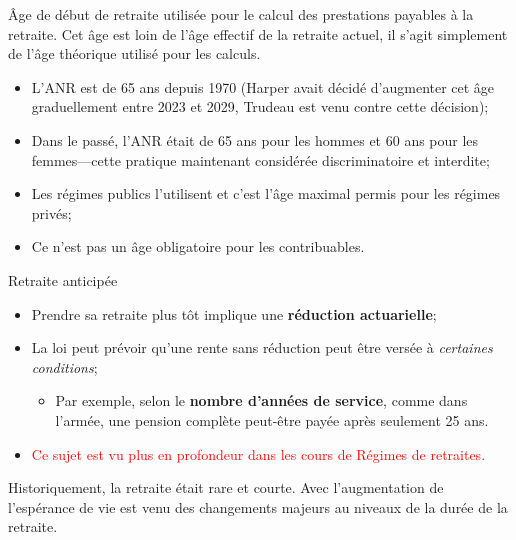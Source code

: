 \documentclass[10pt, french]{article}
\begin{document}
\begin{multicols*}{3}

\begin{definitionNOHFILL}
Âge de début de retraite utilisée pour le calcul des prestations payables à la retraite. Cet âge est loin de l'âge effectif de la retraite actuel, il s'agit simplement de l'âge théorique utilisé pour les calculs.

\begin{rappel_enhanced}[Historique]
\begin{itemize}[leftmargin = *]
	\item	L'ANR est de 65 ans depuis 1970 (Harper avait décidé d'augmenter cet âge graduellement entre 2023 et 2029, Trudeau est venu contre cette décision);
	\item	Dans le passé, l'ANR était de 65 ans pour les hommes et 60 ans pour les femmes---cette pratique maintenant considérée discriminatoire et interdite;
	\item	Les régimes publics l'utilisent et c'est l'âge maximal permis pour les régimes privés;
	\item	Ce n'est pas un âge obligatoire pour les contribuables.
\end{itemize}
\end{rappel_enhanced}

\begin{conceptgen}{Retraite anticipée}
\begin{itemize}[leftmargin = *]
	\item	Prendre sa retraite plus tôt implique une \textbf{réduction actuarielle};
	\item	La loi peut prévoir qu'une rente sans réduction peut être versée à \textit{certaines conditions};
		\begin{itemize}[leftmargin = *]
		\item	Par exemple, selon le \textbf{nombre d'années de service}, comme dans l'armée, une pension complète peut-être payée après seulement 25 ans.
		\end{itemize}
	\item	\textcolor{red}{Ce sujet est vu plus en profondeur dans les cours de Régimes de retraites.}
\end{itemize}
\end{conceptgen} 
\end{definitionNOHFILL}

\begin{rappel_enhanced}
Historiquement, la retraite était rare et courte. Avec l'augmentation de l'espérance de vie est venu des changements majeurs au niveaux de la durée de la retraite. 


\end{rappel_enhanced}
\end{multicols*}
\end{document}

